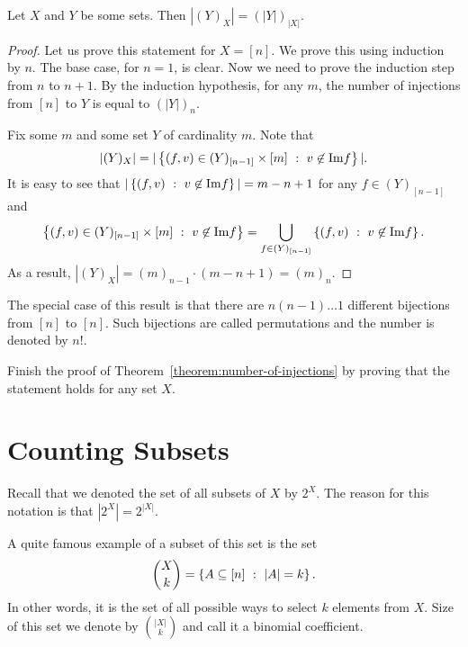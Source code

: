 \begin{theorem}
\label{theorem:number-of-injections}
  Let $X$ and $Y$ be some sets. Then $|(Y)_X| = (|Y|)_{|X|}$.
\end{theorem}
\begin{proof}
  Let us prove this statement for $X = [n]$. We prove this using induction by
  $n$. The base case, for $n = 1$, is clear. Now we need to prove the induction
  step from $n$ to $n + 1$. By the induction hypothesis, for any $m$, the
  number of injections from $[n]$ to $Y$ is equal to $(|Y|)_n$.

  Fix some $m$ and some set $Y$ of cardinality $m$. Note that
  \[
    |(Y)_X| =
    |\set[v \not\in \Im f]{(f, v) \in (Y)_{[n - 1]} \times [m]}|.
  \]
  It is easy to see that $|\set[v \not\in \Im f]{(f, v)}| = m - n + 1$
  for any $f \in (Y)_{[n - 1]}$ and
  \[
    \set[v \not\in \Im f]{(f, v) \in (Y)_{[n - 1]} \times [m]} =
    \bigcup\limits_{f \in (Y)_{[n - 1]}} \set[v \not\in \Im f]{(f, v)}.
  \]
  As a result, $|(Y)_X| = (m)_{n - 1} \cdot (m - n + 1) = (m)_n$.
\end{proof}

The special case of this result is that there are $n (n - 1) \dots 1$ different
bijections from $[n]$ to $[n]$. Such bijections are called permutations and the
number is denoted by $n!$.

\begin{exercise}
  Finish the proof of Theorem~\ref{theorem:number-of-injections} by proving that
  the statement holds for any set $X$.
\end{exercise}

\section{Counting Subsets}
Recall that we denoted the set of all subsets of $X$ by $2^X$. The reason for
this notation is that $|2^X| = 2^{|X|}$.

A quite famous example of a subset of this set is the set
\[
  \binom{X}{k} = \set[|A| = k]{A \subseteq [n]}.
\]
In other words, it is the set of all possible ways to select $k$ elements from
$X$. Size of this set we denote by $\binom{|X|}{k}$ and call it a binomial
coefficient.

